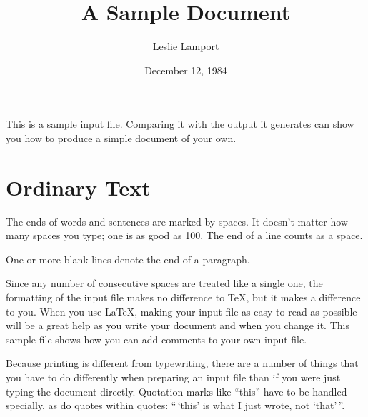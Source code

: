 % 
\title{A Sample Document}  %
\author{Leslie Lamport}    %
\date{December 12, 1984}   %


\maketitle                 %

This is a sample input file.  Comparing it with the output it 
generates can show you how to produce a simple document of 
your own.

\section{Ordinary Text}  %

The ends  of words and sentences are marked 
  by   spaces. It  doesn't matter how many 
spaces    you type; one is as good as 100.  The 
end of   a line counts as a space.

One   or more   blank lines denote the  end 
of  a paragraph.

Since any number of consecutive spaces are treated like a single 
one, the formatting of the input file makes no difference to 
      \TeX,         %
but it makes a difference to you. 
When you use 
      \LaTeX,       %
making your input file as easy to read as possible 
will be a great help as you write your document and when you 
change it.  This sample file shows how you can add comments to 
your own input file.

Because printing is different from typewriting, there are a 
number of things that you have to do differently when preparing 
an input file than if you were just typing the document directly. 
Quotation marks like 
       ``this'' 
have to be handled specially, as do quotes within quotes: 
       ``\,`this' %
        is what I just 
        wrote, not  `that'\,''.

